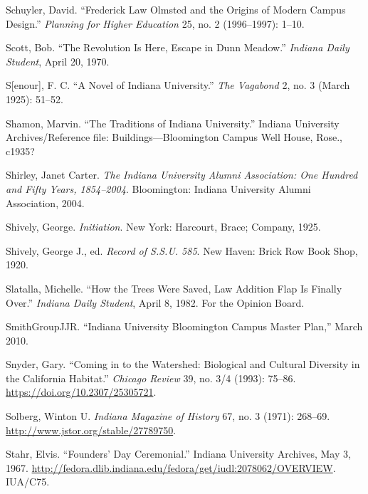 \documentclass[
  american,
  letterpaper,
]{scrreprt}
\newlength{\cslhangindent}
\newenvironment{CSLReferences}[2] %
 {\begin{list}{}{%
  \setlength{\itemindent}{0pt}
  \setlength{\leftmargin}{0pt}
  \setlength{\parsep}{0pt}
  \ifodd #1
   \setlength{\leftmargin}{\cslhangindent}
   \setlength{\itemindent}{-1\cslhangindent}
  \fi
  \setlength{\itemsep}{#2\baselineskip}}}
 {\end{list}}
\begin{document}
\begin{CSLReferences}{1}{0}
Schuyler, David. {``Frederick Law Olmsted and the Origins of Modern
Campus Design.''} \emph{Planning for Higher Education} 25, no. 2
(1996--1997): 1--10.

Scott, Bob. {``The Revolution Is Here, Escape in Dunn Meadow.''}
\emph{Indiana Daily Student}, April 20, 1970.

S{[}enour{]}, F. C. {``A Novel of Indiana University.''} \emph{The
Vagabond} 2, no. 3 (March 1925): 51--52.

Shamon, Marvin. {``The Traditions of Indiana University.''} Indiana
University Archives/Reference file: Buildings---Bloomington Campus Well
House, Rose., c1935?

Shirley, Janet Carter. \emph{The Indiana University Alumni Association:
One Hundred and Fifty Years, 1854--2004}. Bloomington: Indiana
University Alumni Association, 2004.

Shively, George. \emph{Initiation}. New York: Harcourt, Brace; Company,
1925.

Shively, George J., ed. \emph{Record of {S.S.U.} 585}. New Haven: Brick
Row Book Shop, 1920.

Slatalla, Michelle. {``How the Trees Were Saved, Law Addition Flap Is
Finally Over.''} \emph{Indiana Daily Student}, April 8, 1982. For the
Opinion Board.

SmithGroupJJR. {``Indiana University Bloomington Campus Master Plan,''}
March 2010.

Snyder, Gary. {``Coming in to the Watershed: Biological and Cultural
Diversity in the California Habitat.''} \emph{Chicago Review} 39, no.
3/4 (1993): 75--86. \url{https://doi.org/10.2307/25305721}.

Solberg, Winton U. \emph{Indiana Magazine of History} 67, no. 3 (1971):
268--69. \url{http://www.jstor.org/stable/27789750}.

Stahr, Elvis. {``Founders' Day Ceremonial.''} Indiana University
Archives, May 3, 1967.
\url{http://fedora.dlib.indiana.edu/fedora/get/iudl:2078062/OVERVIEW}.
IUA/C75.


\end{CSLReferences}
\end{document}

